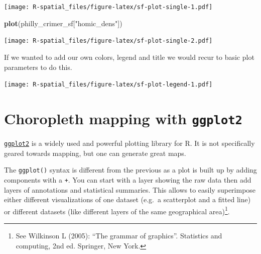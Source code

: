 \documentclass[]{book}
\newenvironment{Shaded}{\begin{snugshade}}{\end{snugshade}}
\newcommand{\KeywordTok}[1]{\textcolor[rgb]{0.13,0.29,0.53}{\textbf{#1}}}
\newcommand{\DataTypeTok}[1]{\textcolor[rgb]{0.13,0.29,0.53}{#1}}
\newcommand{\DecValTok}[1]{\textcolor[rgb]{0.00,0.00,0.81}{#1}}
\newcommand{\StringTok}[1]{\textcolor[rgb]{0.31,0.60,0.02}{#1}}
\newcommand{\OperatorTok}[1]{\textcolor[rgb]{0.81,0.36,0.00}{\textbf{#1}}}
\newcommand{\NormalTok}[1]{#1}
\let\rmarkdownfootnote\footnote%
\def\footnote{\protect\rmarkdownfootnote}
\theoremstyle{definition}
\theoremstyle{definition}
\theoremstyle{definition}
\theoremstyle{remark}
\begin{document}
\texttt{[image: R-spatial\_files/figure-latex/sf-plot-single-1.pdf]}

\begin{Shaded}
\begin{Highlighting}[]
\KeywordTok{plot}\NormalTok{(philly_crimer_sf[}\StringTok{"homic_dens"}\NormalTok{])}
\end{Highlighting}
\end{Shaded}

\texttt{[image: R-spatial\_files/figure-latex/sf-plot-single-2.pdf]}

If we wanted to add our own colors, legend and title we would recur to
basic plot parameters to do this.

\begin{Shaded}
\end{Shaded}

\texttt{[image: R-spatial\_files/figure-latex/sf-plot-legend-1.pdf]}

\section{\texorpdfstring{Choropleth mapping with
\texttt{ggplot2}}{Choropleth mapping with ggplot2}}\label{choropleth-mapping-with-ggplot2}

\href{http://ggplot2.org/}{\texttt{ggplot2}} is a widely used and
powerful plotting library for R. It is not specifically geared towards
mapping, but one can generate great maps.

The \texttt{ggplot()} syntax is different from the previous as a plot is
built up by adding components with a \texttt{+}. You can start with a
layer showing the raw data then add layers of annotations and
statistical summaries. This allows to easily superimpose either
different visualizations of one dataset (e.g.~a scatterplot and a fitted
line) or different datasets (like different layers of the same
geographical area)\footnote{See Wilkinson L (2005): ``The grammar of
  graphics''. Statistics and computing, 2nd ed. Springer, New York.}.
\end{document}
